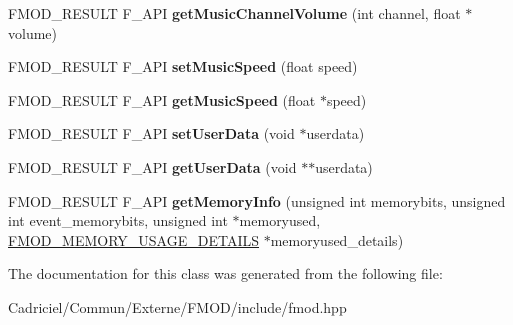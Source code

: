 \begin{DoxyCompactItemize}
\item 
\hypertarget{class_f_m_o_d_1_1_sound_afc1ef61ba84190294a6b1f1f0fd3ab64}{F\-M\-O\-D\-\_\-\-R\-E\-S\-U\-L\-T F\-\_\-\-A\-P\-I {\bfseries get\-Music\-Channel\-Volume} (int channel, float $\ast$volume)}\label{class_f_m_o_d_1_1_sound_afc1ef61ba84190294a6b1f1f0fd3ab64}

\item 
\hypertarget{class_f_m_o_d_1_1_sound_af5fe3deac71212ab13531a7bec20c918}{F\-M\-O\-D\-\_\-\-R\-E\-S\-U\-L\-T F\-\_\-\-A\-P\-I {\bfseries set\-Music\-Speed} (float speed)}\label{class_f_m_o_d_1_1_sound_af5fe3deac71212ab13531a7bec20c918}

\item 
\hypertarget{class_f_m_o_d_1_1_sound_a22e4865bfd9f4bf40633671439dade82}{F\-M\-O\-D\-\_\-\-R\-E\-S\-U\-L\-T F\-\_\-\-A\-P\-I {\bfseries get\-Music\-Speed} (float $\ast$speed)}\label{class_f_m_o_d_1_1_sound_a22e4865bfd9f4bf40633671439dade82}

\item 
\hypertarget{class_f_m_o_d_1_1_sound_ac921f8c260ef5b396a837016d5882713}{F\-M\-O\-D\-\_\-\-R\-E\-S\-U\-L\-T F\-\_\-\-A\-P\-I {\bfseries set\-User\-Data} (void $\ast$userdata)}\label{class_f_m_o_d_1_1_sound_ac921f8c260ef5b396a837016d5882713}

\item 
\hypertarget{class_f_m_o_d_1_1_sound_a829f8e68b254764374c38e6e23f7f8df}{F\-M\-O\-D\-\_\-\-R\-E\-S\-U\-L\-T F\-\_\-\-A\-P\-I {\bfseries get\-User\-Data} (void $\ast$$\ast$userdata)}\label{class_f_m_o_d_1_1_sound_a829f8e68b254764374c38e6e23f7f8df}

\item 
\hypertarget{class_f_m_o_d_1_1_sound_abf8d14ac330b572417f9f949456848d5}{F\-M\-O\-D\-\_\-\-R\-E\-S\-U\-L\-T F\-\_\-\-A\-P\-I {\bfseries get\-Memory\-Info} (unsigned int memorybits, unsigned int event\-\_\-memorybits, unsigned int $\ast$memoryused, \hyperlink{struct_f_m_o_d___m_e_m_o_r_y___u_s_a_g_e___d_e_t_a_i_l_s}{F\-M\-O\-D\-\_\-\-M\-E\-M\-O\-R\-Y\-\_\-\-U\-S\-A\-G\-E\-\_\-\-D\-E\-T\-A\-I\-L\-S} $\ast$memoryused\-\_\-details)}\label{class_f_m_o_d_1_1_sound_abf8d14ac330b572417f9f949456848d5}

\end{DoxyCompactItemize}


The documentation for this class was generated from the following file\-:\begin{DoxyCompactItemize}
\item 
Cadriciel/\-Commun/\-Externe/\-F\-M\-O\-D/include/fmod.\-hpp\end{DoxyCompactItemize}
